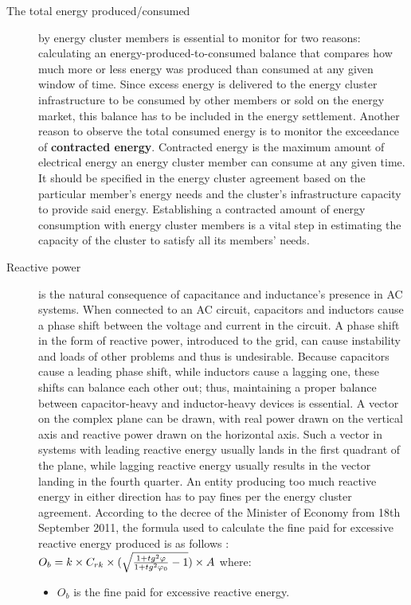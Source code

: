 \begin{description}
  \item[The total energy produced/consumed] by energy cluster members is essential to monitor for two reasons: calculating an energy-produced-to-consumed balance that compares how much more or less energy was produced than consumed at any given window of time. Since excess energy is delivered to the energy cluster infrastructure to be consumed by other members or sold on the energy market, this balance has to be included in the energy settlement. Another reason to observe the total consumed energy is to monitor the exceedance of \textbf{contracted energy}. Contracted energy is the maximum amount of electrical energy an energy cluster member can consume at any given time. It should be specified in the energy cluster agreement based on the particular member's energy needs and the cluster's infrastructure capacity to provide said energy. Establishing a contracted amount of energy consumption with energy cluster members is a vital step in estimating the capacity of the cluster to satisfy all its members' needs. 
  \item[Reactive power] is the natural consequence of capacitance and inductance's presence in AC systems. When connected to an AC circuit, capacitors and inductors cause a phase shift between the voltage and current in the circuit. A phase shift in the form of reactive power, introduced to the grid, can cause instability and loads of other problems and thus is undesirable. Because capacitors cause a leading phase shift, while inductors cause a lagging one, these shifts can balance each other out; thus, maintaining a proper balance between capacitor-heavy and inductor-heavy devices is essential. A vector on the complex plane can be drawn, with real power drawn on the vertical axis and reactive power drawn on the horizontal axis. Such a vector in systems with leading reactive energy usually lands in the first quadrant of the plane, while lagging reactive energy usually results in the vector landing in the fourth quarter. An entity producing too much reactive energy in either direction has to pay fines per the energy cluster agreement. According to the decree of the Minister of Economy from 18th September 2011, the formula used to calculate the fine paid for excessive reactive energy produced is as follows \citep{psr}: $O_{b} = k \times C_{rk} \times (\sqrt{{{1 + tg^2 \varphi} \over {1 + tg^2 \varphi_{0}}} - 1}) \times A$ where:
\begin{itemize}
  \item $O_{b}$ is the fine paid for excessive reactive energy.

\end{itemize}
\end{description}
